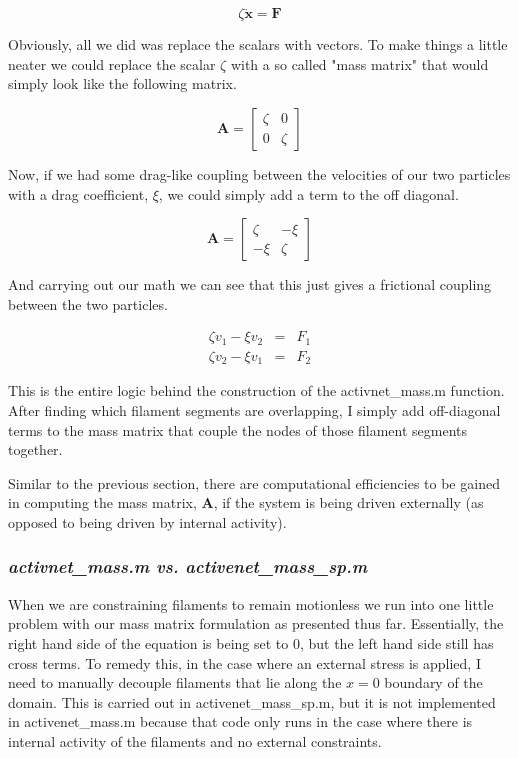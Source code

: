 \begin{equation}
\zeta\mathbf{\dot{x}}=\mathbf{F}
\end{equation}

Obviously, all we did was replace the scalars with vectors.  To make things a little neater we could replace the scalar $\zeta$ with a so called "mass matrix" that would simply look like the following matrix.

\begin{equation}
\mathbf{A} = \begin{bmatrix} \zeta & 0 \\ 0 & \zeta \end{bmatrix}
\end{equation}

Now, if we had some drag-like coupling between the velocities of our two particles with a drag coefficient, $\xi$, we could simply add a term to the off diagonal.

\begin{equation}
\mathbf{A} = \begin{bmatrix} \zeta & -\xi \\ -\xi & \zeta \end{bmatrix}
\end{equation}

And carrying out our math we can see that this just gives a frictional coupling between the two particles.

\begin{equation}
\begin{array}{lcl} \zeta v_1 - \xi v_2  & = & F_1 \\ \zeta v_2 - \xi v_1 & = & F_2 \end{array}
\end{equation}

This is the entire logic behind the construction of the activnet\_mass.m function.  After finding which filament segments are overlapping, I simply add off-diagonal terms to the mass matrix that couple the nodes of those filament segments together.

Similar to the previous section, there are computational efficiencies to be gained in computing the mass matrix, $\mathbf{A}$, if the system is being driven externally (as opposed to being driven by internal activity).  

\subsubsection{\textit{activnet\_mass.m vs. activenet\_mass\_sp.m}}
When we are constraining filaments to remain motionless we run into one little problem with our mass matrix formulation as presented thus far.  Essentially, the right hand side of the equation is being set to 0, but the left hand side still has cross terms.  To remedy this, in the case where an external stress is applied, I need to manually decouple filaments that lie along the $x=0$ boundary of the domain.  This is carried out in activenet\_mass\_sp.m, but it is not implemented in activenet\_mass.m because that code only runs in the case where there is internal activity of the filaments and no external constraints.

